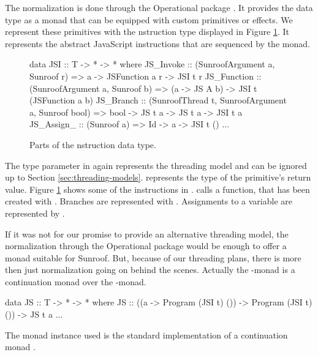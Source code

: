The normalization is done through the Operational package 
\cite{Apfelmus:10:Operational,Hackage:10:Operational}.
It provides the  data type as a monad that
can be equipped with custom primitives or effects.
We represent these primitives with the \JSI nstruction 
type displayed in Figure \ref{fig:jsi-definition}. It represents the 
abstract JavaScript instructions that are sequenced by the 
monad.
\begin{figure}
\begin{Code}
data JSI :: T -> * -> * where
  JS_Invoke   :: (SunroofArgument a, Sunroof r) 
              => a -> JSFunction a r -> JSI t r
  JS_Function :: (SunroofArgument a, Sunroof b) 
              => (a -> JS A b) -> JSI t (JSFunction a b)
  JS_Branch   :: (SunroofThread t, SunroofArgument a, Sunroof bool) 
              => bool -> JS t a -> JS t a  -> JSI t a
  JS_Assign_  :: (Sunroof a) => Id -> a -> JSI t ()
  ...
\end{Code}
\caption{Parts of the \JSI nstruction data type.}
\label{fig:jsi-definition}
\end{figure}
The type parameter  in  again represents 
the threading model and can be ignored up to Section \ref{sec:threading-models}. 
 represents the type of the primitive's return value. 
Figure \ref{fig:jsi-definition} shows some of the instructions
in \JSI.
 calls a function, that has been created with .
Branches are represented with . Assignments to a variable
are represented by .

If it was not for our promise to provide an alternative 
threading model, the normalization through the Operational package
would be enough to offer a monad suitable for Sunroof.
But, because of our threading plans, there is more then just 
normalization going on behind the scenes. 
Actually the \JS-monad is a continuation monad over the 
-monad.
\begin{Code}
data JS :: T -> * -> * where
  JS :: ((a -> Program (JSI t) ()) -> Program (JSI t) ()) -> JS t a
  ...
\end{Code}
The monad instance used is the standard implementation of 
a continuation monad 
\cite{Wadler:90:ComprehendingMonads,Wadler:94:MonadsComposableContinuations}.


